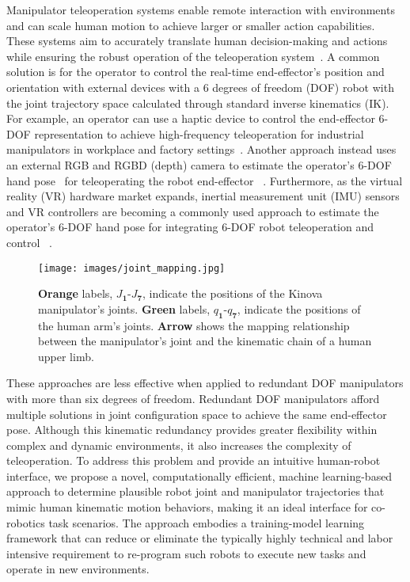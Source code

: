 Manipulator teleoperation systems enable remote interaction with environments and can scale human motion to achieve larger or smaller action capabilities. These systems aim to accurately translate human decision-making and actions while ensuring the robust operation of the teleoperation system~\cite{hirche_human-oriented_2012}. A common solution is for the operator to control the real-time end-effector's position and orientation with external devices with a $6$ degrees of freedom (DOF) robot with the joint trajectory space calculated through standard inverse kinematics (IK). For example, an operator can use a haptic device to control the end-effector 6-DOF representation to achieve high-frequency teleoperation for industrial manipulators in workplace and factory settings~\cite{dekker_design_2023}. Another approach instead uses an external RGB and RGBD (depth) camera to estimate the operator's $6$-DOF hand pose~\cite{schroder_real-time_2012,antotsiou_task-oriented_2018} for teleoperating the robot end-effector ~\cite{ajili_gesture_2017,qin_anyteleop_2024}. Furthermore, as the virtual reality (VR) hardware market expands, inertial measurement unit (IMU) sensors and VR controllers are becoming a commonly used approach to estimate the operator's $6$-DOF hand pose for integrating $6$-DOF robot teleoperation and control ~\cite{lipton_baxters_2018,weigend_anytime_2023}.
\begin{figure}[!t]
    \centering
    \texttt{[image: images/joint\_mapping.jpg]}
    \captionsetup{font=footnotesize}
    \caption{\textbf{Orange} labels, $\mathbf{\textit{J}_1\textit{-}\textit{J}_7}$, indicate the positions of the {K}inova manipulator's joints. \textbf{Green} labels, $\mathbf{\textit{q}_1\textit{-}\textit{q}_7}$, indicate the positions of the human arm's joints. \textbf{Arrow} shows the mapping relationship between the manipulator's joint and the kinematic chain of a human upper limb.}
    \label{fig:jointMapping}
    \vspace{-25pt}
\end{figure}
These approaches are less effective when applied to redundant DOF manipulators with more than six degrees of freedom. Redundant DOF manipulators afford multiple solutions in joint configuration space to achieve the same end-effector pose. Although this kinematic redundancy provides greater flexibility within complex and dynamic environments, it also increases the complexity of teleoperation. To address this problem and provide an intuitive human-robot interface, we propose a novel, computationally efficient, machine learning-based approach to determine plausible robot joint and manipulator trajectories that mimic human kinematic motion behaviors, making it an ideal interface for co-robotics task scenarios. The approach embodies a training-model learning framework that can reduce or eliminate the typically highly technical and labor intensive requirement to re-program such robots to execute new tasks and operate in new environments. 

